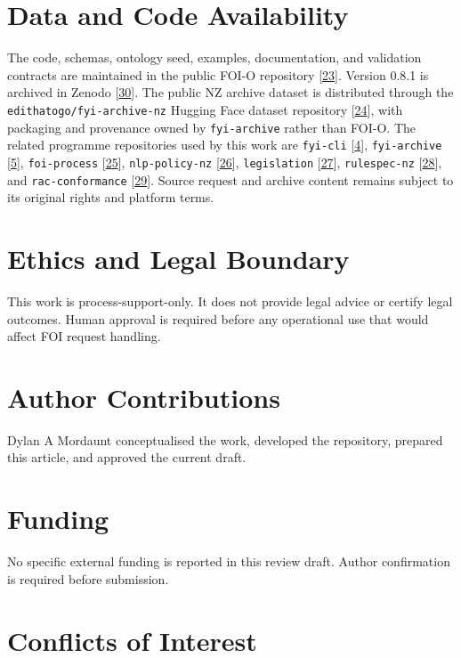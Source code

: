 \documentclass[
]{article}
\begin{document}
\section{Data and Code Availability}\label{data-and-code-availability}

The code, schemas, ontology seed, examples, documentation, and
validation contracts are maintained in the public FOI-O repository
{[}\hyperlink{ref-23}{23}{]}. Version 0.8.1 is archived in Zenodo {[}\hyperlink{ref-30}{30}{]}. The public NZ
archive dataset is distributed through the
\texttt{edithatogo/fyi-archive-nz} Hugging Face dataset repository
{[}\hyperlink{ref-24}{24}{]}, with packaging and provenance owned by \texttt{fyi-archive}
rather than FOI-O. The related programme repositories used by this work
are \texttt{fyi-cli} {[}\hyperlink{ref-4}{4}{]}, \texttt{fyi-archive} {[}\hyperlink{ref-5}{5}{]},
\texttt{foi-process} {[}\hyperlink{ref-25}{25}{]}, \texttt{nlp-policy-nz} {[}\hyperlink{ref-26}{26}{]},
\texttt{legislation} {[}\hyperlink{ref-27}{27}{]}, \texttt{rulespec-nz} {[}\hyperlink{ref-28}{28}{]}, and
\texttt{rac-conformance} {[}\hyperlink{ref-29}{29}{]}. Source request and archive content
remains subject to its original rights and platform terms.

\section{Ethics and Legal Boundary}\label{ethics-and-legal-boundary}

This work is process-support-only. It does not provide legal advice or
certify legal outcomes. Human approval is required before any
operational use that would affect FOI request handling.

\section{Author Contributions}\label{author-contributions}

Dylan A Mordaunt conceptualised the work, developed the repository,
prepared this article, and approved the current draft.

\section{Funding}\label{funding}

No specific external funding is reported in this review draft. Author
confirmation is required before submission.

\section{Conflicts of Interest}\label{conflicts-of-interest}
\end{document}

